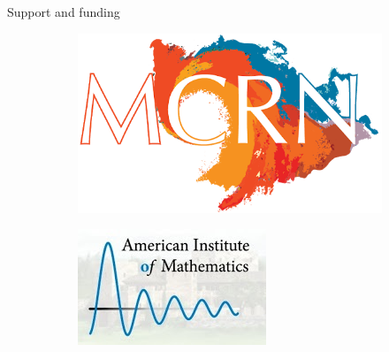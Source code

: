 \documentclass[aspectratio=169]{beamer}
\begin{document}
\begin{frame}{Support and funding}
\vfill
\begin{figure}
     \centering
     \begin{subfigure}[b]{0.3\textwidth}
         \centering
         \includegraphics[width=\textwidth]{figures/mcrn.png}
     \end{subfigure}
     \hfill
     \begin{subfigure}[b]{0.35\textwidth}
         \centering
         \includegraphics[width=\textwidth]{figures/aim.jpg}
     \end{subfigure}
     \hfill
     \begin{subfigure}[b]{0.3\textwidth}
         \centering

\end{subfigure}
\end{figure}
\end{frame}
\end{document}
